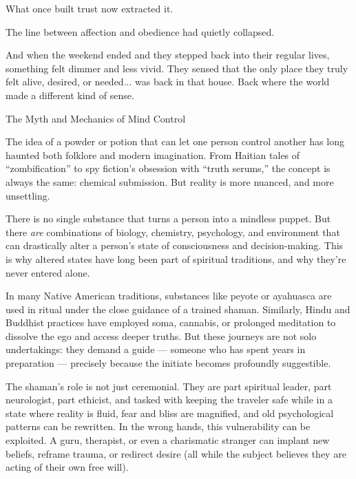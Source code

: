 What once built trust now extracted it.

The line between affection and obedience had quietly collapsed.

And when the weekend ended and they stepped back 
into their regular lives, something felt dimmer and less vivid. 
They sensed that the only place they truly felt alive, 
desired, or needed... was back in that house. 
Back where the world made a different kind of sense.

\medskip

\begin{PsychologicalSidebar}{The Myth and Mechanics of Mind Control}

  The idea of a powder or potion that can let one person control another has long haunted both folklore and modern 
  imagination. From Haitian tales of “zombification” to spy fiction's obsession with “truth serums,” the concept is 
  always the same: chemical submission. But reality is more nuanced, and more unsettling.

  \medskip
  
  There is no single substance that turns a person into a mindless puppet. But there \emph{are} combinations of biology, 
  chemistry, psychology, and environment that can drastically alter a person’s state of consciousness and decision-making. 
  This is why altered states have long been part of spiritual traditions, and why they’re never entered alone.

  \medskip
  
  In many Native American traditions, substances like peyote or ayahuasca are used in ritual under the close guidance of 
  a trained shaman. Similarly, Hindu and Buddhist practices have employed soma, cannabis, or prolonged meditation 
  to dissolve the ego and access deeper truths. But these journeys are not solo undertakings: they demand a guide — 
  someone who has spent years in preparation — precisely because the initiate becomes profoundly suggestible. 

  \medskip
  
  The shaman’s role is not just ceremonial. They are part spiritual leader, part neurologist, part ethicist, and tasked with 
  keeping the traveler safe while in a state where reality is fluid, fear and bliss are magnified, and old psychological 
  patterns can be rewritten. In the wrong hands, this vulnerability can be exploited. A guru, therapist, or even a 
  charismatic stranger can implant new beliefs, reframe trauma, or redirect desire (all while the subject believes they 
  are acting of their own free will).


\end{PsychologicalSidebar}
